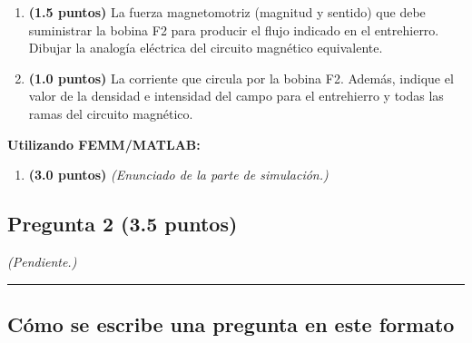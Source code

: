 \documentclass[
  spanish,
  11pt,
  a4paper,
]{article}
\providecommand{\tightlist}{%
  \setlength{\itemsep}{0pt}\setlength{\parskip}{0pt}}
\begin{document}
\begin{enumerate}
\def\labelenumi{\alph{enumi})}
\item
  \textbf{(1.5 puntos)} La fuerza magnetomotriz (magnitud y sentido) que
  debe suministrar la bobina F2 para producir el flujo indicado en el
  entrehierro. Dibujar la analogía eléctrica del circuito magnético
  equivalente.
\item
  \textbf{(1.0 puntos)} La corriente que circula por la bobina F2.
  Además, indique el valor de la densidad e intensidad del campo para el
  entrehierro y todas las ramas del circuito magnético.
\end{enumerate}

\textbf{Utilizando FEMM/MATLAB:}

\begin{enumerate}
\def\labelenumi{\alph{enumi})}
\setcounter{enumi}{2}
\tightlist
\item
  \textbf{(3.0 puntos)} \emph{(Enunciado de la parte de simulación.)}
\end{enumerate}

\subsection{Pregunta 2 (3.5 puntos)}\label{pregunta-2-3.5-puntos}

\emph{(Pendiente.)}

\begin{center}\rule{0.5\linewidth}{0.5pt}\end{center}

\subsection{Cómo se escribe una pregunta en este
formato}\label{cuxf3mo-se-escribe-una-pregunta-en-este-formato}
\end{document}

